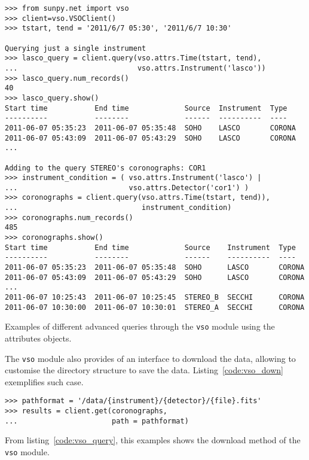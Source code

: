 \begin{listing}[h]
\begin{verbatim}
>>> from sunpy.net import vso
>>> client=vso.VSOClient()
>>> tstart, tend = '2011/6/7 05:30', '2011/6/7 10:30'

Querying just a single instrument
>>> lasco_query = client.query(vso.attrs.Time(tstart, tend), 
...                            vso.attrs.Instrument('lasco'))
>>> lasco_query.num_records()
40
>>> lasco_query.show() 
Start time           End time             Source  Instrument  Type  
----------           --------             ------  ----------  ----  
2011-06-07 05:35:23  2011-06-07 05:35:48  SOHO    LASCO       CORONA
2011-06-07 05:43:09  2011-06-07 05:43:29  SOHO    LASCO       CORONA
...

Adding to the query STEREO's coronographs: COR1
>>> instrument_condition = ( vso.attrs.Instrument('lasco') | 
...                          vso.attrs.Detector('cor1') )
>>> coronographs = client.query(vso.attrs.Time(tstart, tend)), 
...                             instrument_condition)
>>> coronographs.num_records()
485
>>> coronographs.show() 
Start time           End time             Source    Instrument  Type  
----------           --------             ------    ----------  ----  
2011-06-07 05:35:23  2011-06-07 05:35:48  SOHO      LASCO       CORONA
2011-06-07 05:43:09  2011-06-07 05:43:29  SOHO      LASCO       CORONA
...
2011-06-07 10:25:43  2011-06-07 10:25:45  STEREO_B  SECCHI      CORONA
2011-06-07 10:30:00  2011-06-07 10:30:01  STEREO_A  SECCHI      CORONA
\end{verbatim}
\caption{Examples of different advanced queries through the \texttt{vso} 
  module using the attributes objects.}
\label{code:vso_query}
\end{listing}

The \texttt{vso} module also provides of an interface to download the data,
allowing to customise the directory structure to save the data.
Listing~\ref{code:vso_down} exemplifies such case.


\begin{listing}[h]
\begin{verbatim}
>>> pathformat = '/data/{instrument}/{detector}/{file}.fits'
>>> results = client.get(coronographs, 
...                      path = pathformat)

\end{verbatim}
\caption{From listing~\ref{code:vso_query}, this examples shows the 
  download method of the \texttt{vso} module.}
\label{code:vso_down}
\end{listing}
